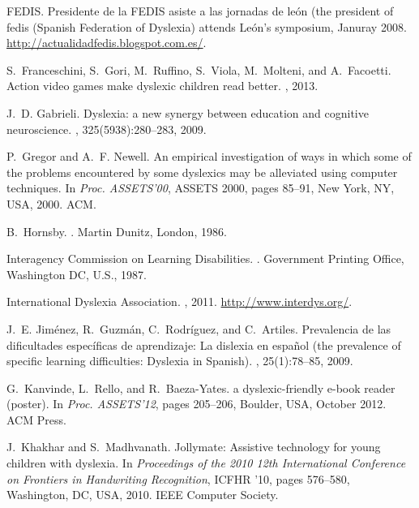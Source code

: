 \documentclass[letterpaper]{sig-alternate-2013}
\begin{document}
\begin{thebibliography}{10}
{FEDIS}.
\newblock Presidente de la {FEDIS} asiste a las jornadas de le\'on (the
  president of fedis ({S}panish {F}ederation of {D}yslexia) attends {L}e\'on's
  symposium, Januray 2008.
\newblock \url{http://actualidadfedis.blogspot.com.es/}.

S.~Franceschini, S.~Gori, M.~Ruffino, S.~Viola, M.~Molteni, and A.~Facoetti.
\newblock Action video games make dyslexic children read better.
, 2013.

J.~D. Gabrieli.
\newblock Dyslexia: a new synergy between education and cognitive neuroscience.
, 325(5938):280--283, 2009.

P.~Gregor and A.~F. Newell.
\newblock An empirical investigation of ways in which some of the problems
  encountered by some dyslexics may be alleviated using computer techniques.
\newblock In {\em Proc. ASSETS'00}, ASSETS 2000, pages 85--91, New York, NY,
  USA, 2000. ACM.

B.~Hornsby.
.
\newblock Martin Dunitz, London, 1986.

{Interagency Commission on Learning Disabilities}.
.
\newblock Government Printing Office, Washington DC, U.S., 1987.

{International Dyslexia Association}.
, 2011.
\newblock \url{http://www.interdys.org/}.

J.~E. Jim\'enez, R.~Guzm\'an, C.~Rodr\'iguez, and C.~Artiles.
\newblock Prevalencia de las dificultades espec\'ificas de aprendizaje: La
  dislexia en espa\~nol (the prevalence of specific learning difficulties:
  Dyslexia in {S}panish).
, 25(1):78--85,
  2009.

G.~Kanvinde, L.~Rello, and R.~Baeza-Yates.
 a dyslexic-friendly e-book reader (poster).
\newblock In {\em Proc. ASSETS'12}, pages 205--206, Boulder, USA, October 2012.
  ACM Press.

J.~Khakhar and S.~Madhvanath.
\newblock Jollymate: Assistive technology for young children with dyslexia.
\newblock In {\em Proceedings of the 2010 12th International Conference on
  Frontiers in Handwriting Recognition}, ICFHR '10, pages 576--580, Washington,
  DC, USA, 2010. IEEE Computer Society.


\end{thebibliography}
\end{document}

